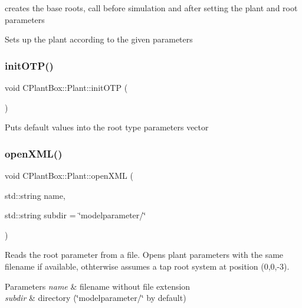 creates the base roots, call before simulation and after setting the plant and root parameters 

Sets up the plant according to the given parameters \mbox{\label{classCPlantBox_1_1Plant_a81bf77f8871c255323ab42c74e67ace1}} 
\subsubsection{\texorpdfstring{init\+O\+T\+P()}{initOTP()}}
{\footnotesize\ttfamily void C\+Plant\+Box\+::\+Plant\+::init\+O\+TP (\begin{DoxyParamCaption}{ }\end{DoxyParamCaption})\hspace{0.3cm}{\ttfamily [protected]}}

Puts default values into the root type parameters vector \mbox{\label{classCPlantBox_1_1Plant_a35816a01023b902882e7ddae14b3edd8}} 
\subsubsection{\texorpdfstring{open\+X\+M\+L()}{openXML()}}
{\footnotesize\ttfamily void C\+Plant\+Box\+::\+Plant\+::open\+X\+ML (\begin{DoxyParamCaption}\item[{std\+::string}]{name,  }\item[{std\+::string}]{subdir = {\ttfamily \char`\"{}modelparameter/\char`\"{}} }\end{DoxyParamCaption})}

Reads the root parameter from a file. Opens plant parameters with the same filename if available, othterwise assumes a tap root system at position (0,0,-\/3).


\begin{DoxyParams}{Parameters}
{\em name} & filename without file extension \\
\hline
{\em subdir} & directory (\char`\"{}modelparameter/\char`\"{} by default) \\
\hline
\end{DoxyParams}
\mbox{\label{classCPlantBox_1_1Plant_a026e40b062913144566ab022302916a2}} 

